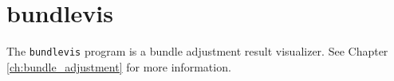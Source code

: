 
\clearpage

\section{bundlevis}
\label{bundlevis}

The \texttt{bundlevis} program is a bundle adjustment result
visualizer.  See Chapter \ref{ch:bundle_adjustment} for more
information.

